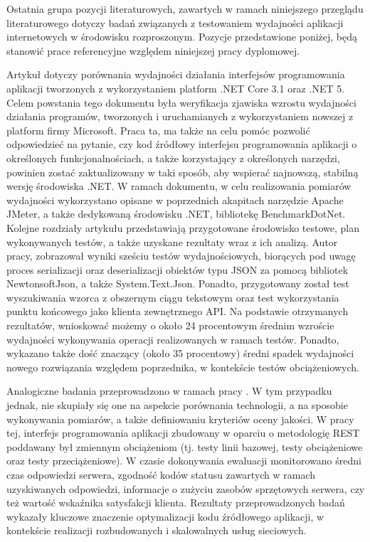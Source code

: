 Ostatnia grupa pozycji literaturowych, zawartych w ramach niniejszego przeglądu literaturowego dotyczy badań związanych z testowaniem wydajności aplikacji internetowych w środowisku rozproszonym. Pozycje przedstawione poniżej, będą stanowić prace referencyjne względem niniejszej pracy dyplomowej.

Artykuł \cite{hyttinen2021net} dotyczy porównania wydajności działania interfejsów programowania aplikacji tworzonych z wykorzystaniem platform .NET Core 3.1 oraz .NET 5. Celem powstania tego dokumentu była weryfikacja zjawiska wzrostu wydajności działania programów, tworzonych i uruchamianych z wykorzystaniem nowszej z platform firmy Microsoft. Praca ta, ma także na celu pomóc pozwolić odpowiedzieć na pytanie, czy kod źródłowy interfejsu programowania aplikacji o określonych funkcjonalnościach, a także korzystający z określonych narzędzi, powinien zostać zaktualizowany w taki sposób, aby wspierać najnowszą, stabilną wersję środowiska .NET. W ramach dokumentu, w celu realizowania pomiarów wydajności wykorzystano opisane w poprzednich akapitach narzędzie Apache JMeter, a także dedykowaną środowisku .NET, bibliotekę BenchmarkDotNet. Kolejne rozdziały artykułu przedstawiają przygotowane środowisko testowe, plan wykonywanych testów, a także uzyskane rezultaty wraz z ich analizą. Autor pracy, zobrazował wyniki sześciu testów wydajnościowych, biorących pod uwagę proces serializacji oraz deserializacji obiektów typu JSON za pomocą bibliotek NewtonsoftJson, a także System.Text.Json. Ponadto, przygotowany został test wyszukiwania wzorca z obszernym ciągu tekstowym oraz test wykorzystania punktu końcowego jako klienta zewnętrznego API. Na podstawie otrzymanych rezultatów, wnioskować możemy o około 24 procentowym średnim wzroście wydajności wykonywania operacji realizowanych w ramach testów. Ponadto, wykazano także dość znaczący (około 35 procentowy) średni spadek wydajności nowego rozwiązania względem poprzednika, w kontekście testów obciążeniowych.

Analogiczne badania przeprowadzono w ramach pracy \cite{zacharuk}. W tym przypadku jednak, nie skupiały się one na aspekcie porównania technologii, a na sposobie wykonywania pomiarów, a także definiowaniu kryteriów oceny jakości. W pracy tej, interfejs programowania aplikacji zbudowany w oparciu o metodologię REST poddawany był zmiennym obciążeniom (tj. testy linii bazowej, testy obciążeniowe oraz testy przeciążeniowe). W czasie dokonywania ewaluacji monitorowano średni czas odpowiedzi serwera, zgodność kodów statusu zawartych w ramach uzyskiwanych odpowiedzi, informacje o zużyciu zasobów sprzętowych serwera, czy też wartość wskaźnika satysfakcji klienta. Rezultaty przeprowadzonych badań wykazały kluczowe znaczenie optymalizacji kodu źródłowego aplikacji, w kontekście realizacji rozbudowanych i skalowalnych usług sieciowych.